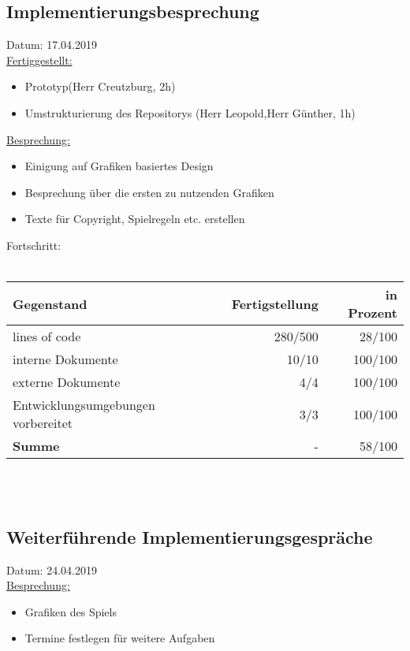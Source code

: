 \documentclass[12pt]{article}
\begin{document}
\newpage


\newpage
\subsection{Implementierungsbesprechung}
Datum: 17.04.2019 \\

\uline{Fertiggestellt:}
\begin{itemize}\itemsep0em
\item Prototyp(Herr Creutzburg, 2h)
\item Umstrukturierung des Repositorys (Herr Leopold,Herr Günther, 1h)
\end{itemize}
\uline{Besprechung:}
\begin{itemize}\itemsep0em
\item Einigung auf Grafiken basiertes Design
\item Besprechung über die ersten zu nutzenden Grafiken
\item Texte für Copyright, Spielregeln etc. erstellen 
\end{itemize}

Fortschritt:\\\\
\begin{tabularx}{\textwidth}{|X|r|r|} \hline
\textbf{Gegenstand}&\textbf{Fertigstellung} & \textbf{in Prozent}\\ \hline
lines of code & 280/500  & 28/100\\ \hline
interne Dokumente & 10/10 & 100/100  \\ \hline
externe Dokumente & 4/4 & 100/100 \\ \hline
Entwicklungsumgebungen vorbereitet & 3/3 & 100/100 \\ \hline %
\textbf{Summe} & - & 58/100  \\ \hline
\end{tabularx}\\\\
\newpage

\newpage
\subsection{Weiterführende Implementierungsgespräche}
Datum: 24.04.2019 \\

\uline{Besprechung:}
\begin{itemize}\itemsep0em
\item Grafiken des Spiels
\item Termine festlegen für weitere Aufgaben
\end{itemize}
\end{document}

